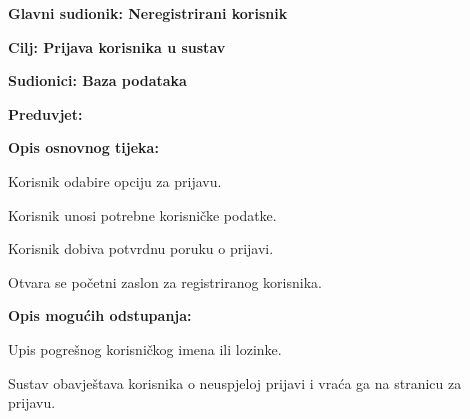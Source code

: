 					
					\noindent {}
					\begin{packed_item}
						
						\item \textbf{Glavni sudionik: Neregistrirani korisnik}
						\item  \textbf{Cilj: Prijava korisnika u sustav} 
						\item  \textbf{Sudionici: Baza podataka} 
						\item  \textbf{Preduvjet:} 
						\item  \textbf{Opis osnovnog tijeka:}
						
						\item[] \begin{packed_enum}
							
							\item Korisnik odabire opciju za prijavu.
							\item Korisnik unosi potrebne korisničke podatke.
							\item Korisnik dobiva potvrdnu poruku o prijavi.
							\item Otvara se početni zaslon za registriranog korisnika.
							
						\end{packed_enum}
						
						\item  \textbf{Opis mogućih odstupanja:}
						
						\item[] \begin{packed_item}
							
							\item[2.a] Upis pogrešnog korisničkog imena ili lozinke.
							\item[] \begin{packed_enum}
								
								\item  Sustav obavještava korisnika o neuspjeloj prijavi i vraća ga na stranicu za prijavu.
								
							\end{packed_enum} 
							
						\end{packed_item}
					\end{packed_item}
					
